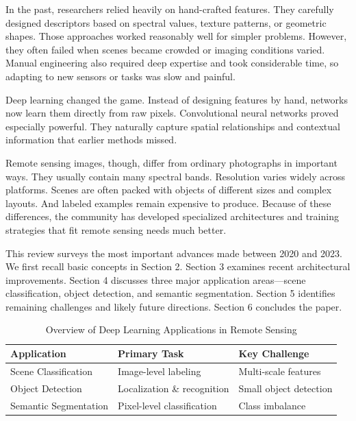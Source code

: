 \documentclass[12pt,a4paper]{article}
\begin{document}
In the past, researchers relied heavily on hand-crafted features. They carefully designed descriptors based on spectral values, texture patterns, or geometric shapes. Those approaches worked reasonably well for simpler problems. However, they often failed when scenes became crowded or imaging conditions varied. Manual engineering also required deep expertise and took considerable time, so adapting to new sensors or tasks was slow and painful.

Deep learning changed the game. Instead of designing features by hand, networks now learn them directly from raw pixels. Convolutional neural networks proved especially powerful. They naturally capture spatial relationships and contextual information that earlier methods missed.

Remote sensing images, though, differ from ordinary photographs in important ways. They usually contain many spectral bands. Resolution varies widely across platforms. Scenes are often packed with objects of different sizes and complex layouts. And labeled examples remain expensive to produce. Because of these differences, the community has developed specialized architectures and training strategies that fit remote sensing needs much better.

This review surveys the most important advances made between 2020 and 2023. We first recall basic concepts in Section 2. Section 3 examines recent architectural improvements. Section 4 discusses three major application areas—scene classification, object detection, and semantic segmentation. Section 5 identifies remaining challenges and likely future directions. Section 6 concludes the paper.

\begin{table}[htbp]
\centering
\caption{Overview of Deep Learning Applications in Remote Sensing}
\label{tab:applications}
\begin{tabular}{@{}lll@{}}
\toprule
\textbf{Application}          & \textbf{Primary Task}         & \textbf{Key Challenge}      \\
\midrule
Scene Classification          & Image-level labeling          & Multi-scale features        \\
Object Detection              & Localization \& recognition   & Small object detection      \\
Semantic Segmentation         & Pixel-level classification   & Class imbalance             \\
\bottomrule
\end{tabular}
\end{table}
\end{document}
